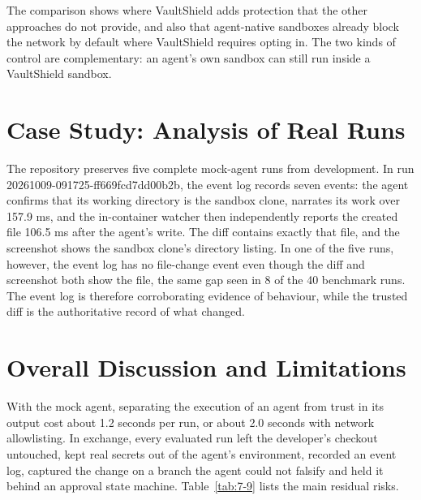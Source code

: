 \documentclass[12pt,a4paper,oneside]{report}
\begin{document}
\addtocounter{table}{-1}
\par\medskip
\endgroup

The comparison shows where VaultShield adds protection that the other approaches do not provide, and also that agent-native sandboxes already block the network by default where VaultShield requires opting in. The two kinds of control are complementary: an agent's own sandbox can still run inside a VaultShield sandbox.

\section{Case Study: Analysis of Real Runs}\label{case-study-analysis-of-real-runs}

The repository preserves five complete mock-agent runs from development. In run 20261009-091725-ff669fcd7dd00b2b, the event log records seven events: the agent confirms that its working directory is the sandbox clone, narrates its work over 157.9 ms, and the in-container watcher then independently reports the created file 106.5 ms after the agent's write. The diff contains exactly that file, and the screenshot shows the sandbox clone's directory listing. In one of the five runs, however, the event log has no file-change event even though the diff and screenshot both show the file, the same gap seen in 8 of the 40 benchmark runs. The event log is therefore corroborating evidence of behaviour, while the trusted diff is the authoritative record of what changed.

\section{Overall Discussion and Limitations}\label{discussion-and-limitations}

With the mock agent, separating the execution of an agent from trust in its output cost about 1.2 seconds per run, or about 2.0 seconds with network allowlisting. In exchange, every evaluated run left the developer's checkout untouched, kept real secrets out of the agent's environment, recorded an event log, captured the change on a branch the agent could not falsify and held it behind an approval state machine. Table~\ref{tab:7-9} lists the main residual risks.

\begingroup\small
\end{document}
